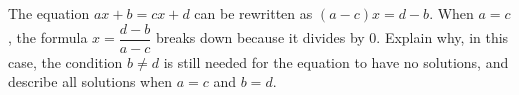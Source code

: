 The equation $ax+b=cx+d$ can be rewritten as $(a-c)x=d-b$. When $a=c$, the formula $x=\dfrac{d-b}{a-c}$ breaks down because it divides by $0$. Explain why, in this case, the condition $b\ne d$ is still needed for the equation to have no solutions, and describe all solutions when $a=c$ and $b=d$.
